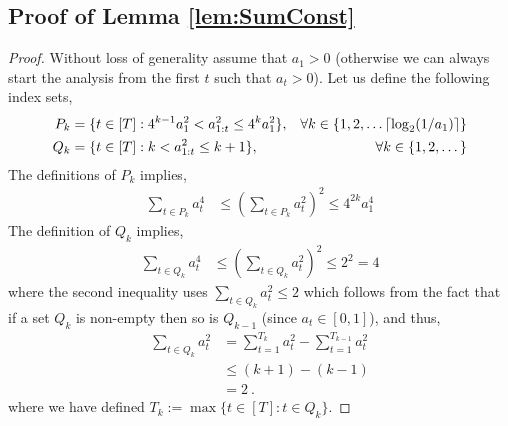 \subsection{Proof of Lemma \ref{lem:SumConst}} \label{subsec:proof-lem-SumCost}
\begin{proof}
Without loss of generality assume that $a_1>0$ (otherwise we can always start the analysis from the first $t$ such that $a_t>0$).
Let us define the following index sets,
\begin{align*}
P_k &= \{ t\in[T]: 4^{k-1} a_1^2 < a^2_{1:t}\leq 4^{k} a_1^2 \}, & \forall k \in \{1, 2, \dots \ceil*{\log_2(1/a_1)}\}
\\
Q_k  &= \{t\in[T]:   k< a^2_{1:t} \leq k+1 \}, & \forall k \in \{1, 2, \dots\}
\end{align*}
The definitions of $P_k$ implies,
\begin{align}
\sum_{t\in P_k} a_t^4 &\leq \left(\sum_{t\in P_k} a_t^2\right)^2 \leq  4^{2k}a_1^4   \label{eq:IndexP}
\end{align}
The definition of  $Q_k$ implies,
\begin{align}
\sum_{t\in Q_k} a_t^4 &\leq \left(\sum_{t\in Q_k} a_t^2\right)^2 \leq 2^2=4     \label{eq:IndexQ}
\end{align}
where the second inequality  uses $\sum_{t\in Q_k}a_t^2 \leq 2$ which follows from the fact that if a set $Q_k$ is non-empty then so is $Q_{k-1}$ (since $a_t\in[0,1]$), and thus,
\begin{align*}
\sum_{t\in Q_k} a_t^2 
&=
 \sum_{t=1}^{T_k} a_t^2 - \sum_{t=1}^{T_{k-1}} a_t^2 \\
 &\leq (k+1) - (k-1) \\
 &=2~.
\end{align*}
where we have defined $T_k :=\max\{t\in[T] :  t\in Q_k\}$.



\end{proof}
